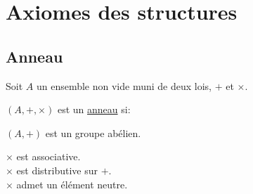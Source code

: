 \documentclass[12pt,twoside,a4paper]{article}
\author{MPSI 2}
\begin{document}
	\maketitle
	\section{Axiomes des structures}
		\subsection{Anneau}
			\begin{flushleft}
				Soit $A$ un ensemble non vide muni de deux lois, $+$ et $\times$.
			\end{flushleft}
			\begin{defi}
				$(A,+,\times)$ est un \underline{anneau} si:
				\begin{liste}
					\item[\cercle1]$(A,+)$ est un groupe abélien.
					\item[\cercle2]$\times$ est associative.\\
						$\times$ est distributive sur $+$.\\
						$\times$ admet un élément neutre.
				\end{liste}
			\end{defi}
\end{document}
